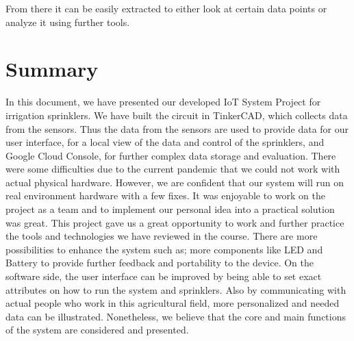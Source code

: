 \documentclass{article}
\begin{document}
From there it can be easily extracted to either look at certain data points or analyze it using further tools.

\section{Summary}
In this document, we have presented our developed IoT System Project for irrigation sprinklers. We have built the circuit in TinkerCAD, which collects data from the sensors. Thus the data from the sensors are used to provide data for our user interface, for a local view of the data and control of the sprinklers, and Google Cloud Console, for further complex data storage and evaluation. There were some difficulties due to the current pandemic that we could not work with actual physical hardware. However, we are confident that our system will run on real environment hardware with a few fixes. \newline
It was enjoyable to work on the project as a team and to implement our personal idea into a practical solution was great. This project gave us a great opportunity to work and further practice the tools and technologies we have reviewed in the course. There are more possibilities to enhance the system such as; more components like LED and Battery to provide further feedback and portability to the device. On the software side, the user interface can be improved by being able to set exact attributes on how to run the system and sprinklers. Also by communicating with actual people who work in this agricultural field, more personalized and needed data can be illustrated. Nonetheless, we believe that the core and main functions of the system are considered and presented.
\end{document}
